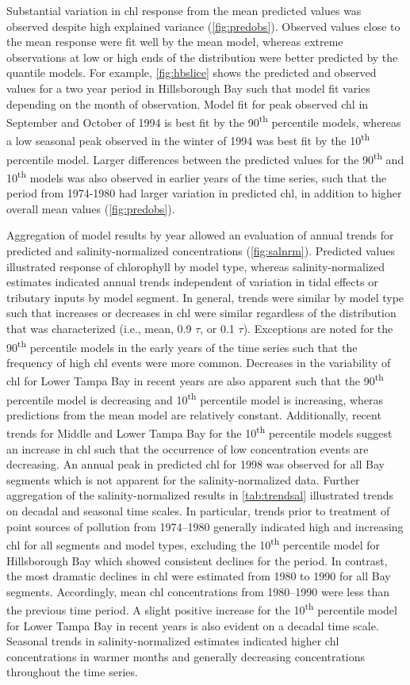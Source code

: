 \documentclass[letterpaper,12pt,oneside]{article}\usepackage[]{graphicx}\usepackage[]{color}
\newcommand{\nine}{90\textsuperscript{th} percentile }
\newcommand{\ten}{10\textsuperscript{th} percentile }
\begin{document}
Substantial variation in \ac{chl} response from the mean predicted values was observed despite high explained variance (\cref{fig:predobs}).  Observed values close to the mean response were fit well by the mean model, whereas extreme observations at low or high ends of the distribution were better predicted by the quantile models. For example, \cref{fig:hbslice} shows the predicted and observed values for a two year period in Hillsborough Bay such that model fit varies depending on the month of observation.  Model fit for peak observed \ac{chl} in September and October of 1994 is best fit by the \nine models, whereas a low seasonal peak observed in the winter of 1994 was best fit by the \ten model.  Larger differences between the predicted values for the 90\textsuperscript{th} and 10\textsuperscript{th} models was also observed in earlier years of the time series, such that the period from 1974-1980 had larger variation in predicted \ac{chl}, in addition to higher overall mean values (\cref{fig:predobs}).  

Aggregation of model results by year allowed an evaluation of annual trends for predicted and salinity-normalized concentrations (\cref{fig:salnrm}).  Predicted values illustrated response of chlorophyll by model type, whereas salinity-normalized estimates indicated annual trends independent of variation in tidal effects or tributary inputs by model segment.  In general, trends were similar by model type such that increases or decreases in \ac{chl} were similar regardless of the distribution that was characterized (i.e., mean, 0.9 $\tau$, or 0.1 $\tau$).  Exceptions are noted for the \nine models in the early years of the time series such that the frequency of high \ac{chl} events were more common.  Decreases in the variability of \ac{chl} for Lower Tampa Bay in recent years are also apparent such that the \nine model is decreasing and \ten model is increasing, wheras predictions from the mean model are relatively constant.  Additionally, recent trends for Middle and Lower Tampa Bay for the \ten models suggest an increase in \ac{chl} such that the occurrence of low concentration events are decreasing.  An annual peak in predicted \ac{chl} for 1998 was observed for all Bay segments which is not apparent for the salinity-normalized data. Further aggregation of the salinity-normalized results in \cref{tab:trendsal} illustrated trends on decadal and seasonal time scales.  In particular, trends prior to treatment of point sources of pollution from 1974--1980 generally indicated high and increasing \ac{chl} for all segments and model types, excluding the \ten model for Hillsborough Bay which showed consistent declines for the period.  In contrast, the most dramatic declines in \ac{chl} were estimated from 1980 to 1990 for all Bay segments.  Accordingly, mean \ac{chl} concentrations from 1980--1990 were less than the previous time period.  A slight positive increase for the \ten model for Lower Tampa Bay in recent years is also evident on a decadal time scale.  Seasonal trends in salinity-normalized estimates indicated higher \ac{chl} concentrations in warmer months and generally decreasing concentrations throughout the time series.
\end{document}
